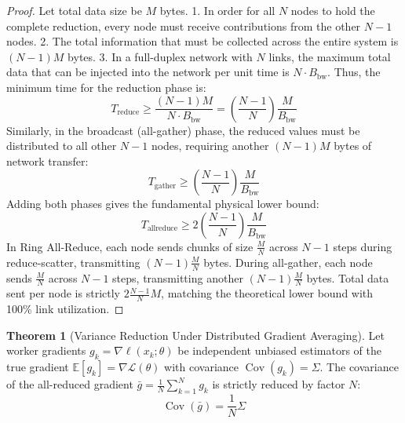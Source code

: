 \documentclass[11pt,a4paper]{article}
\theoremstyle{definition}
\newtheorem{theorem}{\textbf{Theorem}}[section]
\begin{document}
\begin{proof}
Let total data size be $M$ bytes.
1. In order for all $N$ nodes to hold the complete reduction, every node must receive contributions from the other $N - 1$ nodes.
2. The total information that must be collected across the entire system is $(N - 1) M$ bytes.
3. In a full-duplex network with $N$ links, the maximum total data that can be injected into the network per unit time is $N \cdot B_{\text{bw}}$.
Thus, the minimum time for the reduction phase is:
{\boldmath
\begin{equation}
T_{\text{reduce}} \ge \frac{(N - 1) M}{N \cdot B_{\text{bw}}} = \left( \frac{N - 1}{N} \right) \frac{M}{B_{\text{bw}}}
\end{equation}
}
Similarly, in the broadcast (all-gather) phase, the reduced values must be distributed to all other $N - 1$ nodes, requiring another $(N - 1) M$ bytes of network transfer:
{\boldmath
\begin{equation}
T_{\text{gather}} \ge \left( \frac{N - 1}{N} \right) \frac{M}{B_{\text{bw}}}
\end{equation}
}
Adding both phases gives the fundamental physical lower bound:
{\boldmath
\begin{equation}
T_{\text{allreduce}} \ge 2 \left( \frac{N - 1}{N} \right) \frac{M}{B_{\text{bw}}}
\end{equation}
}
In Ring All-Reduce, each node sends chunks of size $\frac{M}{N}$ across $N - 1$ steps during reduce-scatter, transmitting $(N - 1) \frac{M}{N}$ bytes. During all-gather, each node sends $\frac{M}{N}$ across $N - 1$ steps, transmitting another $(N - 1) \frac{M}{N}$ bytes.
Total data sent per node is strictly $2 \frac{N - 1}{N} M$, matching the theoretical lower bound with 100\% link utilization.
\end{proof}

\begin{theorem}[Variance Reduction Under Distributed Gradient Averaging]
Let worker gradients $g_k = \nabla \ell(x_k; \theta)$ be independent unbiased estimators of the true gradient $\mathbb{E}[g_k] = \nabla \mathcal{L}(\theta)$ with covariance $\operatorname{Cov}(g_k) = \Sigma$. The covariance of the all-reduced gradient $\bar{g} = \frac{1}{N} \sum_{k=1}^N g_k$ is strictly reduced by factor $N$:
{\boldmath
\begin{equation}
\operatorname{Cov}(\bar{g}) = \frac{1}{N} \Sigma
\end{equation}
}
\end{theorem}
\end{document}
